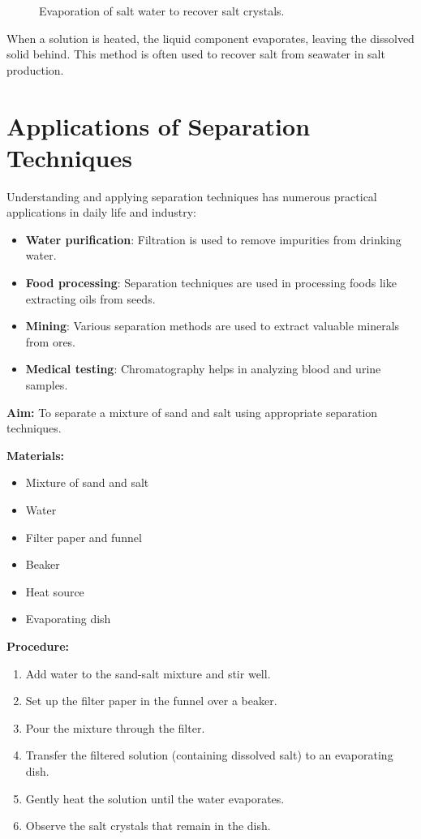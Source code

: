 \documentclass[justified,notoc]{tufte-book}
\newenvironment{investigation}[1]{%
    \begin{tcolorbox}[colback=primary!5,colframe=primary,title=\textbf{Investigation: #1}]
}{%
    \end{tcolorbox}
}
\begin{document}
\begin{figure}[h]
  \caption{Evaporation of salt water to recover salt crystals.}
  \label{fig:evaporation}
\end{figure}

When a solution is heated, the liquid component evaporates, leaving the dissolved solid behind. This method is often used to recover salt from seawater in salt production.

\FloatBarrier

\section{Applications of Separation Techniques}

Understanding and applying separation techniques has numerous practical applications in daily life and industry:

\begin{itemize}
    \item \textbf{Water purification}: Filtration is used to remove impurities from drinking water.
    \item \textbf{Food processing}: Separation techniques are used in processing foods like extracting oils from seeds.
    \item \textbf{Mining}: Various separation methods are used to extract valuable minerals from ores.
    \item \textbf{Medical testing}: Chromatography helps in analyzing blood and urine samples.
\end{itemize}

\begin{investigation}{Separating a Mixture of Sand and Salt}
\textbf{Aim:} To separate a mixture of sand and salt using appropriate separation techniques.

\textbf{Materials:} 
\begin{itemize}
    \item Mixture of sand and salt
    \item Water
    \item Filter paper and funnel
    \item Beaker
    \item Heat source
    \item Evaporating dish
\end{itemize}

\textbf{Procedure:}
\begin{enumerate}
    \item Add water to the sand-salt mixture and stir well.
    \item Set up the filter paper in the funnel over a beaker.
    \item Pour the mixture through the filter.
    \item Transfer the filtered solution (containing dissolved salt) to an evaporating dish.
    \item Gently heat the solution until the water evaporates.
    \item Observe the salt crystals that remain in the dish.
\end{enumerate}
\end{investigation}
\end{document}
